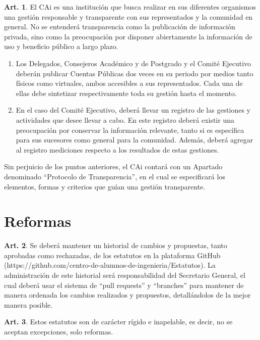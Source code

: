 \documentclass[letterpaper,11pt]{article}
\theoremstyle{definition}%
\newtheorem{art}{Art.} %
\begin{document}
\begin{art}\label{definicionProtocoloTransparencia}
	El CAi es una institución que busca realizar en sus diferentes organismos una gestión responsable y transparente con sus representados y la comunidad en general. No se entenderá transparencia como la publicación de información privada, sino como la preocupación por disponer abiertamente la información de uso y beneficio público a largo plazo.
	\begin{enumerate}
		\item Los Delegados, Consejeros Académico y de Postgrado y el Comité Ejecutivo deberán publicar Cuentas Públicas dos veces en su periodo por medios tanto físicos como virtuales, ambos accesibles a sus representados. Cada una de ellas debe sintetizar respectivamente toda su gestión hasta el momento.
		\item En el caso del Comité Ejecutivo, deberá llevar un registro de las gestiones y actividades que desee llevar a cabo. En este registro deberá existir una preocupación por conservar la información relevante, tanto si es específica para sus sucesores como general para la comunidad. Además, deberá agregar al registro mediciones respecto a los resultados de estas gestiones.
	\end{enumerate}
	Sin perjuicio de los puntos anteriores, el CAi contará con un Apartado denominado ``Protocolo de Transparencia'', en el cual se especificará los elementos, formas y criterios que guían una gestión transparente.
\end{art}

\section{Reformas}\label{reformas}

\begin{art}
	Se deberá mantener un historial de cambios y propuestas, tanto aprobadas como rechazadas, de los estatutos en la plataforma GitHub (https://github.com/centro-de-alumnos-de-ingenieria/Estatutos). La administración de este historial será responsabilidad del Secretario General, el cual deberá usar el sistema de “pull requests” y “branches” para mantener de manera ordenada los cambios realizados y propuestos, detallándolos de la mejor manera posible.
\end{art}

\begin{art}
	Estos estatutos son de carácter rígido e inapelable, es decir, no se aceptan excepciones, solo reformas.
\end{art}
\end{document}
